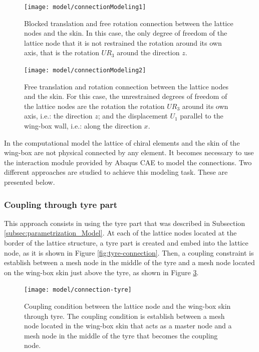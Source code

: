     \begin{figure}[!htpb]
      \centering
      \texttt{[image: model/connectionModeling1]}
      \caption[Blocked translation and free rotation connection between the lattice nodes and the skin]{Blocked translation and free rotation connection between the lattice nodes and the skin. In this case, the only degree of freedom of the lattice node that it is not restrained the rotation around its own axis, that is the rotation $UR_3$ around the direction $z$.}\label{fig:connectionModeling1}
    \end{figure}

    \begin{figure}[!htpb]
      \centering
      \texttt{[image: model/connectionModeling2]}
      \caption[Free translation and rotation connection between the lattice nodes and the skin]{Free translation and rotation connection between the lattice nodes and the skin. For this case, the unrestrained degrees of freedom of the lattice nodes are the rotation the rotation $UR_3$ around its own axis, i.e.: the direction $z$; and the displacement $U_1$ parallel to the wing-box wall, i.e.: along the direction $x$.}\label{fig:connectionModeling2}
    \end{figure}

    In the computational model the lattice of chiral elements and the skin of the wing-box are not physical connected by any element. It becomes necessary to use the interaction module provided by Abaqus CAE to model the connections. Two different approaches are studied to achieve this modeling task. These are presented below.

    \subsubsection{Coupling through tyre part}

    This approach consists in using the tyre part that was described in Subsection \ref{subsec:parametrization_Model}. At each of the lattice nodes located at the border of the lattice structure, a tyre part is created and embed into the lattice node, as it is shown in Figure \ref{fig:tyre-connection}. Then, a coupling constraint is establish between a mesh node in the middle of the tyre and a mesh node located on the wing-box skin just above the tyre, as shown in Figure \ref{fig:connection-tyre}.

    \begin{figure}[!htpb]
      \centering
      \texttt{[image: model/connection-tyre]}
      \caption[Coupling condition between the lattice node and the wing-box skin through tyre]{Coupling condition between the lattice node and the wing-box skin through tyre. The coupling condition is establish between a mesh node located in the wing-box skin that acts as a master node and a mesh node in the middle of the tyre that becomes the coupling node.}\label{fig:connection-tyre}
    \end{figure}

